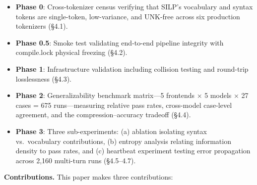 \documentclass{article}
\begin{document}
\begin{itemize}



\item

  \textbf{Phase 0}: Cross-tokenizer census verifying that SILP's vocabulary and syntax tokens are single-token, low-variance, and UNK-free across six production tokenizers (\S4.1).

\item

  \textbf{Phase 0.5}: Smoke test validating end-to-end pipeline integrity with compile.lock physical freezing (\S4.2).

\item

  \textbf{Phase 1}: Infrastructure validation including collision testing and round-trip losslessness (\S4.3).

\item

  \textbf{Phase 2}: Generalizability benchmark matrix---5 frontends $\times$ 5 models $\times$ 27 cases = 675 runs---measuring relative pass rates, cross-model case-level agreement, and the compression--accuracy tradeoff (\S4.4).

\item

  \textbf{Phase 3}: Three sub-experiments: (a) ablation isolating syntax vs.~vocabulary contributions, (b) entropy analysis relating information density to pass rates, and (c) heartbeat experiment testing error propagation across 2,160 multi-turn runs (\S4.5--4.7).

\end{itemize}



\textbf{Contributions.} This paper makes three contributions:
\end{document}
